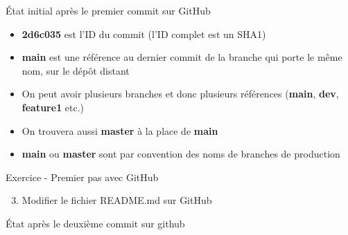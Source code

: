 \documentclass[a4paper,11pt]{beamer}
\newcounter{exampleBlockCounter}
\begin{document}
\begin{frame}

\begin{block}{État initial après le premier commit sur GitHub}
\centering
{}
\begin{itemize}
	\item \textbf{2d6c035} est l'ID du commit (l'ID complet est un SHA1)
	\item \textbf{main} est une référence au dernier commit de la branche qui porte le même nom, sur le dépôt distant
	\item On peut avoir plusieurs branches et donc plusieurs références (\textbf{main}, \textbf{dev}, \textbf{feature1} etc.)
	\item On trouvera aussi \textbf{master} à la place de \textbf{main}
	\item \textbf{main} ou \textbf{master} sont par convention des noms de branches de production
\end{itemize}


\end{block}
\end{frame}

\begin{frame}
\begin{exampleblock}{Exercice  - Premier pas avec GitHub} 
\begin{enumerate}
	\setcounter{enumi}{2}
    \item Modifier le fichier README.md sur GitHub
\end{enumerate}
\end{exampleblock}

\pause

\begin{block}{État après le deuxième commit sur github}
\centering
{}
\end{block}
\end{frame}
\end{document}
